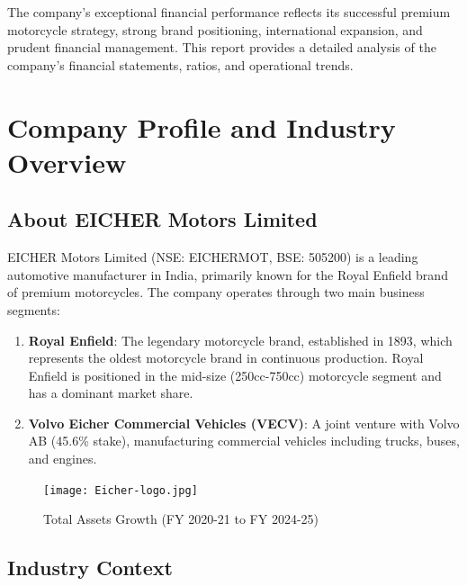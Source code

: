\documentclass[8pt,a4paper]{article}
\begin{document}
The company's exceptional financial performance reflects its successful premium motorcycle strategy, strong brand positioning, international expansion, and prudent financial management. This report provides a detailed analysis of the company's financial statements, ratios, and operational trends.

\section{Company Profile and Industry Overview}

\subsection{About EICHER Motors Limited}

EICHER Motors Limited (NSE: EICHERMOT, BSE: 505200) is a leading automotive manufacturer in India, primarily known for the Royal Enfield brand of premium motorcycles. The company operates through two main business segments:

\begin{enumerate}
    \item \textbf{Royal Enfield}: The legendary motorcycle brand, established in 1893, which represents the oldest motorcycle brand in continuous production. Royal Enfield is positioned in the mid-size (250cc-750cc) motorcycle segment and has a dominant market share.
    \item \textbf{Volvo Eicher Commercial Vehicles (VECV)}: A joint venture with Volvo AB (45.6\% stake), manufacturing commercial vehicles including trucks, buses, and engines.
\end{enumerate}


\begin{figure}[H]
\centering
\texttt{[image: Eicher-logo.jpg]}
\caption{Total Assets Growth (FY 2020-21 to FY 2024-25)}
\label{fig:assets_growth}
\end{figure}

\subsection{Industry Context}
\end{document}
